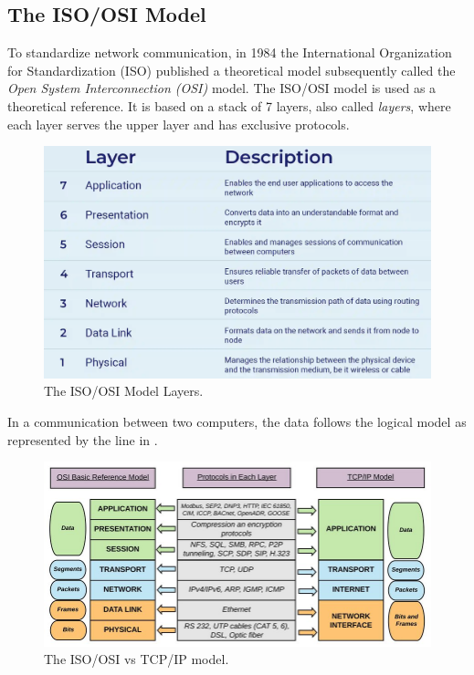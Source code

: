 \subsection{The ISO/OSI Model}

To standardize network communication, in 1984 the International Organization for Standardization (ISO) published a theoretical model subsequently called the \textit{Open System Interconnection (OSI)} model. The ISO/OSI model is used as a theoretical reference. It is based on a stack of 7 layers, also called \textit{layers}, where each layer serves the upper layer and has exclusive protocols.

\begin{figure}[h]
    \centering
    \includegraphics[width=\textwidth]{images/layers_osi.png}
    \caption{The ISO/OSI Model Layers.}
    \label{fig:osi_layers}
\end{figure}

In a communication between two computers, the data follows the logical model as represented by the line in .

\begin{figure}[h!]
    \centering
    \includegraphics[width=\textwidth]{images/iso_osi_tcp.png}
    \caption{The ISO/OSI vs TCP/IP model.}
    \label{fig:osi_model}
\end{figure}

